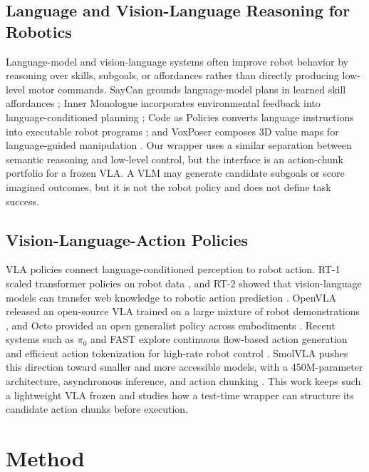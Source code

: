 \documentclass[conference]{IEEEtran}
\begin{document}
\subsection{Language and Vision-Language Reasoning for Robotics}

Language-model and vision-language systems often improve robot behavior by
reasoning over skills, subgoals, or affordances rather than directly producing
low-level motor commands. SayCan grounds language-model plans in learned skill
affordances \cite{ahn2022saycan}; Inner Monologue incorporates environmental
feedback into language-conditioned planning \cite{huang2022inner}; Code as
Policies converts language instructions into executable robot programs
\cite{liang2022code}; and VoxPoser composes 3D value maps for language-guided
manipulation \cite{huang2023voxposer}. Our wrapper uses a similar separation
between semantic reasoning and low-level control, but the interface is an
action-chunk portfolio for a frozen VLA. A VLM may generate candidate subgoals
or score imagined outcomes, but it is not the robot policy and does not define
task success.

\subsection{Vision-Language-Action Policies}

VLA policies connect language-conditioned perception to robot action. RT-1
scaled transformer policies on robot data \cite{brohan2022rt1}, and RT-2
showed that vision-language models can transfer web knowledge to robotic
action prediction \cite{zitkovich2023rt2}. OpenVLA released an open-source VLA
trained on a large mixture of robot demonstrations \cite{kim2024openvla}, and
Octo provided an open generalist policy across embodiments \cite{octo2024}.
Recent systems such as \(\pi_0\) and FAST explore continuous flow-based action
generation and efficient action tokenization for high-rate robot control
\cite{black2024pi0,pertsch2025fast}. SmolVLA pushes this direction toward
smaller and more accessible models, with a 450M-parameter architecture,
asynchronous inference, and action chunking \cite{shukor2025smolvla}. This
work keeps such a lightweight VLA frozen and studies how a test-time wrapper
can structure its candidate action chunks before execution.

\section{Method}
\end{document}
